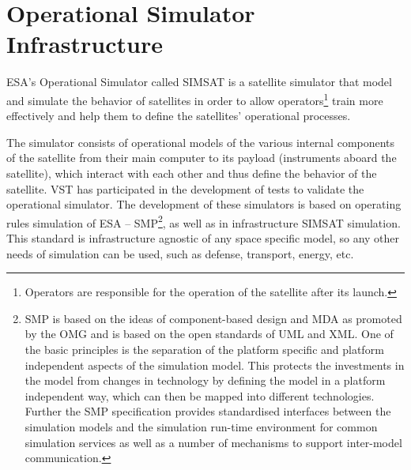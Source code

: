 \section{Operational Simulator Infrastructure}
\ac{ESA}'s Operational Simulator called \ac{SIMSAT}
is a satellite simulator that model and simulate
the behavior of satellites in order to allow operators\footnote{Operators are responsible for the operation of the satellite after its launch.} train more effectively 
and help them to define the satellites' operational processes.

The simulator consists of operational models of the various internal components of the satellite from their main computer to its payload (instruments aboard the satellite),
which interact with each other and thus define the behavior of the satellite.
\ac{VST} has participated in the development of tests to validate the operational simulator.
The development of these simulators is based on operating rules simulation of
\ac{ESA} -- \ac{SMP}\footnote{\ac{SMP} is based on the ideas of component-based design and \ac{MDA}
as promoted by the \ac{OMG} and is based on the open standards of \ac{UML} and \ac{XML}.
One of the basic principles is the separation of the platform specific and platform independent aspects of the simulation model.
This protects the investments in the model from changes in technology by defining the model in a platform independent way, which can then be mapped into different technologies.
Further the \ac{SMP} specification provides standardised interfaces between the simulation models and the simulation run-time environment for common simulation services as well as a
number of mechanisms to support inter-model communication.\cite{1A,2A,3A,4A,5A}}, as well as in infrastructure \ac{SIMSAT} simulation.
This standard is infrastructure agnostic of any space specific model, so any other needs of simulation can be used, such as defense, transport, energy, etc.\\

